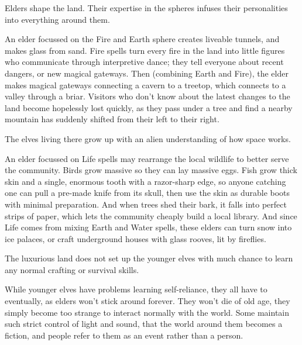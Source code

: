 \label{elvenGlades}

\renewcommand\npcsymbol{\El}

\noindent
Elders shape the land.
Their expertise in the \glspl{sphere} infuses their personalities into everything around them.

\begin{exampletext}
  An elder focussed on the Fire and Earth \gls{sphere} creates liveable tunnels, and makes glass from sand.
  \renewcommand\npcsymbol{\glsentrytext{Fire}\glsentrytext{Earth}}
  Fire \glspl{spell} turn every fire in the land into little figures who communicate through interpretive dance; they tell everyone about recent dangers, or new magical gateways.
  Then (combining Earth and Fire), the elder makes magical gateways connecting a cavern to a treetop, which connects to a valley through a briar.
  Visitors who don't know about the latest changes to the land become hopelessly lost quickly, as they pass under a tree and find a nearby mountain has suddenly shifted from their left to their right.

  The elves living there grow up with an alien understanding of how space works.
\end{exampletext}


\begin{exampletext}
  An elder focussed on Life \glspl{spell} may rearrange the local wildlife to better serve the community.
  \renewcommand\npcsymbol{\glsentrytext{Water}\glsentrytext{Earth}}
  Birds grow massive so they can lay massive eggs.
  Fish grow thick skin and a single, enormous tooth with a razor-sharp edge, so anyone catching one can pull a pre-made knife from its skull, then use the skin as durable boots with minimal preparation.
  And when trees shed their bark, it falls into perfect strips of paper, which lets the community cheaply build a local library.
  And since Life comes from mixing Earth and Water \glspl{spell}, these elders can turn snow into ice palaces, or craft underground houses with glass rooves, lit by fireflies.

  The luxurious land does not set up the younger elves with much chance to learn any normal crafting or survival skills.
\end{exampletext}

While younger elves have problems learning self-reliance, they all have to eventually, as elders won't stick around forever.
They won't die of old age, they simply become too strange to interact normally with the world.
Some maintain such strict control of light and sound, that the world around them becomes a fiction, and people refer to them as an event rather than a person.

